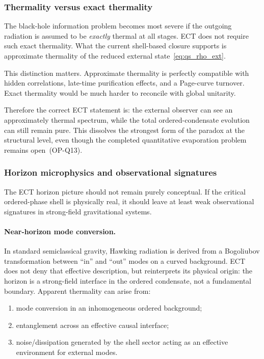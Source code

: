 \documentclass[11pt,a4paper]{article}
\numberwithin{equation}{section}
\begin{document}
\subsubsection*{Thermality versus exact thermality}

The black-hole information problem becomes most severe if the outgoing
radiation is assumed to be \emph{exactly} thermal at all stages.
ECT does not require such exact thermality.
What the current shell-based closure supports is approximate thermality
of the reduced external state~\eqref{eq:qs_rho_ext}.

This distinction matters.
Approximate thermality is perfectly compatible with hidden correlations,
late-time purification effects, and a Page-curve turnover.
Exact thermality would be much harder to reconcile with global unitarity.

Therefore the correct ECT statement is: the external observer can see an
approximately thermal spectrum, while the total ordered-condensate
evolution can still remain pure.
This dissolves the strongest form of the paradox at the structural level,
even though the completed quantitative evaporation problem remains
open~(OP-Q13).

\subsubsection*{Horizon microphysics and observational signatures}

The ECT horizon picture should not remain purely conceptual.
If the critical ordered-phase shell is physically real, it should leave
at least weak observational signatures in strong-field gravitational
systems.

\paragraph{Near-horizon mode conversion.}
In standard semiclassical gravity, Hawking radiation is derived from a
Bogoliubov transformation between ``in'' and ``out'' modes on a curved
background.
ECT does not deny that effective description, but reinterprets its
physical origin: the horizon is a strong-field interface in the ordered
condensate, not a fundamental boundary.
Apparent thermality can arise from:
\begin{enumerate}[label=(\roman*)]
  \item mode conversion in an inhomogeneous ordered background;
  \item entanglement across an effective causal interface;
  \item noise/dissipation generated by the shell sector acting as an
    effective environment for external modes.
\end{enumerate}
\end{document}
